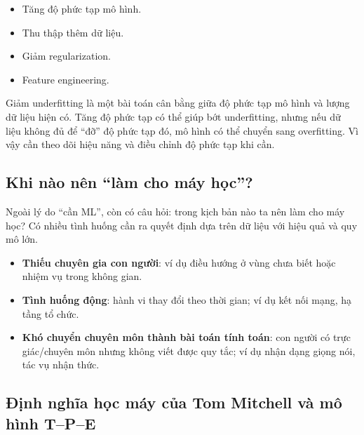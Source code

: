 \begin{phuongphap}[title={Cách giảm underfitting}]
\begin{itemize}
  \item Tăng độ phức tạp mô hình.
  \item Thu thập thêm dữ liệu.
  \item Giảm regularization.
  \item Feature engineering.
\end{itemize}
\end{phuongphap}

\begin{luuy}[title={Cân bằng giữa underfitting và overfitting}]
Giảm underfitting là một bài toán cân bằng giữa độ phức tạp mô hình và lượng dữ liệu hiện có.
Tăng độ phức tạp có thể giúp bớt underfitting, nhưng nếu dữ liệu không đủ để “đỡ” độ phức tạp đó, mô hình có thể chuyển sang overfitting.
Vì vậy cần theo dõi hiệu năng và điều chỉnh độ phức tạp khi cần.
\end{luuy}

\subsection{Khi nào nên “làm cho máy học”?}

\begin{dongco}[title={Vì sao phải để máy học thay vì viết quy tắc?}]
Ngoài lý do “cần ML”, còn có câu hỏi: trong kịch bản nào ta nên làm cho máy học?
Có nhiều tình huống cần ra quyết định dựa trên dữ liệu với hiệu quả và quy mô lớn.
\end{dongco}

\begin{phuongphap}[title={Một số tình huống}]
\begin{itemize}
  \item \textbf{Thiếu chuyên gia con người}: ví dụ điều hướng ở vùng chưa biết hoặc nhiệm vụ trong không gian.
  \item \textbf{Tình huống động}: hành vi thay đổi theo thời gian; ví dụ kết nối mạng, hạ tầng tổ chức.
  \item \textbf{Khó chuyển chuyên môn thành bài toán tính toán}: con người có trực giác/chuyên môn nhưng không viết được quy tắc; ví dụ nhận dạng giọng nói, tác vụ nhận thức.
\end{itemize}
\end{phuongphap}

\subsection{Định nghĩa học máy của Tom Mitchell và mô hình T--P--E}

